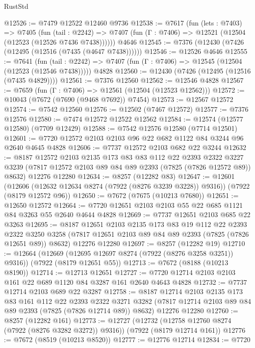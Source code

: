 \begin{lexlean}{RustStd}
\begin{coremodule}
@12526 := @7479 @12522 @12460 @9736
@12538 := @7617
    (fun (lets : @7403) =>
    @7405
      (fun (tail : @2242) =>
      @7407 (fun (Γ : @7406) => @12521 (@12504 (@12523 (@12526 @7436 @7438))))))
    @4646
@12545 := @7376 (@12430 (@7426 (@12495 (@12516 (@7435 (@4647 @7438))))))
@12546 := @12526 @4646
@12555 := @7641
    (fun (tail : @2242) => @7407 (fun (Γ : @7406) => @12545 (@12504 (@12523 (@12546 @7438)))))
    @4828
@12560 := @12430 (@7426 (@12495 (@12516 (@7435 @4829))))
@12561 := @7376 @12560
@12562 := @12546 @4828
@12567 := @7659 (fun (Γ : @7406) => @12561 (@12504 (@12523 @12562)))
@12572 := @10043 (@7672 (@7690 (@9468 @7692)) @7454)
@12573 := @12567 @12572
@12574 := @7542 @12560
@12576 := @12502 (@7467 @12572)
@12577 := @7376 @12576
@12580 := @7474 @12572 @12522 @12562
@12584 := @12574 (@12577 @12580) (@7709 @12429)
@12588 := @7542 @12576 @12580 (@7714 @12501)
@12601 := @7720 @12572 @2103 @2103 @96 @22 @682 @1122 @84 @3244 @96 @2640 @4645 @4828
@12606 := @7737 @12572 @2103 @682 @22 @3244
@12632 := @8187
    @12572
    @2103
    @2135
    @173
    @83
    @83
    @112
    @22
    @2393
    @2322
    @3227
    @3239
    (@7817 @12572 @2103 @89 @84 @89 @2393 (@7825 (@7826 @12572 @89)) @8632)
    @12276
    @12280
@12634 := @8257 (@12282 @83)
@12647 := @12601
    (@12606 (@12632 @12634 @8274 (@7922 (@8276 @3239 @3228)) @9316))
    (@7922 (@8179 @12572 @96))
@12650 := @7672 (@7675 (@10213 @7680))
@12651 := @12650 @12572
@12664 := @7720 @12651 @2103 @2103 @55 @22 @685 @1121 @84 @3263 @55 @2640 @4644 @4828
@12669 := @7737 @12651 @2103 @685 @22 @3263
@12695 := @8187
    @12651
    @2103
    @2135
    @173
    @83
    @19
    @112
    @22
    @2393
    @2322
    @3250
    @3258
    (@7817 @12651 @2103 @89 @84 @89 @2393 (@7825 (@7826 @12651 @89)) @8632)
    @12276
    @12280
@12697 := @8257 (@12282 @19)
@12710 := @12664
    (@12669 (@12695 @12697 @8274 (@7922 (@8276 @3258 @3251)) @9316))
    (@7922 (@8179 @12651 @55))
@12713 := @7672 (@8188 (@10213 @8190))
@12714 := @12713 @12651
@12727 := @7720 @12714 @2103 @2103 @161 @22 @689 @1120 @84 @3287 @161 @2640 @4643 @4828
@12732 := @7737 @12714 @2103 @689 @22 @3287
@12758 := @8187
    @12714
    @2103
    @2135
    @173
    @83
    @161
    @112
    @22
    @2393
    @2322
    @3271
    @3282
    (@7817 @12714 @2103 @89 @84 @89 @2393 (@7825 (@7826 @12714 @89)) @8632)
    @12276
    @12280
@12760 := @8257 (@12282 @161)
@12773 := @12727
    (@12732 (@12758 @12760 @8274 (@7922 (@8276 @3282 @3272)) @9316))
    (@7922 (@8179 @12714 @161))
@12776 := @7672 (@8519 (@10213 @8520))
@12777 := @12776 @12714
@12834 := @7720

\end{coremodule}
\end{lexlean}

